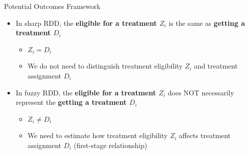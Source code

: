 \documentclass[hyperref={pdfpagelabels=false}]{beamer}
\begin{document}
\begin{frame}{Potential Outcomes Framework}{}
	\begin{itemize}
		
		\item In sharp RDD, the \textbf{eligible for a treatment $Z_{i}$} is the same as \textbf{getting a treatment $D_{i}$} 
		\vspace{0.2cm}
		\begin{itemize}
			\item $Z_{i}=D_{i}$
					\vspace{0.2cm}
			
			\item We do not need to distinguish treatment eligibility $Z_{i}$ and treatment assignment $D_{i}$
		\end{itemize}
		
		\vspace{0.2cm}
		\item In fuzzy RDD, the \textbf{eligible for a treatment $Z_{i}$} does NOT necessarily represent the \textbf{getting a treatment $D_{i}$} 
		
		\vspace{0.2cm}
		\begin{itemize}
			\item $Z_{i}\neq D_{i}$
			
			\vspace{0.2cm}
			
			\item We need to estimate how treatment eligibility $Z_{i}$ affects treatment assignment $D_{i}$ (first-stage relationship)
		\end{itemize}
		
		
		
		
		
	\end{itemize}
\end{frame}
\end{document}
